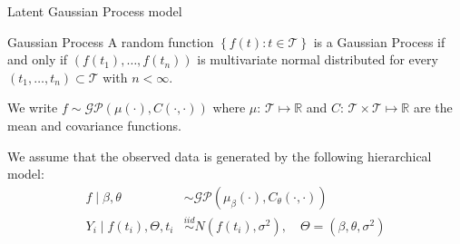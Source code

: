 \documentclass[ignorenonframetext,xcolor=pdflatex,table,dvipsnames,serif]{beamer}
\begin{document}
\begin{frame}{Latent Gaussian Process model}
\begin{alertblock}{Gaussian Process}
A random function $\left\{f(t) : t \in \mathcal{T}\right\}$ is a Gaussian Process if and only if $(f(t_1), \ldots, f(t_n))$ is multivariate normal distributed for every $(t_1, \ldots, t_n) \subset \mathcal{T}$ with $n < \infty$. 

We write $f \sim \mathcal{GP}(\mu(\cdot), C(\cdot, \cdot))$ where $\mu\colon\, \mathcal{T} \mapsto \mathbb{R}$ and $C\colon\, \mathcal{T} \times \mathcal{T} \mapsto \mathbb{R}$ are the mean and covariance functions.
\end{alertblock}

\pause

\vspace{1cm}

We assume that the observed data is generated by the following hierarchical model:
\begin{align*}
  f \mid \beta, \theta &\sim \mathcal{GP}(\mu_\beta(\cdot), C_\theta(\cdot,\cdot))\\
  Y_i \mid f(t_i), \Theta, t_i &\overset{iid}{\sim} N(f(t_i), \sigma^2), \quad \Theta = (\beta, \theta, \sigma^2)
\end{align*}
\end{frame}
\end{document}
